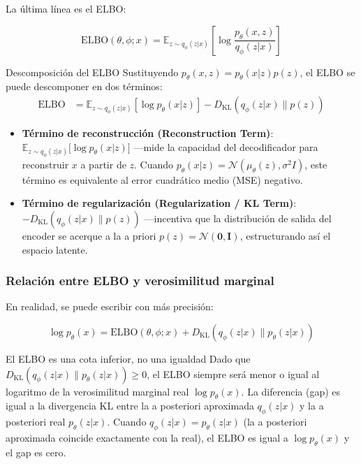La última línea es el ELBO:

$$\text{ELBO}(\theta, \phi; x) = \mathbb{E}_{z \sim q_\phi(z|x)} \left[\log \frac{p_\theta(x, z)}{q_\phi(z|x)}\right]$$

\begin{importantbox}{Descomposición del ELBO}
Sustituyendo $p_\theta(x, z) = p_\theta(x|z)p(z)$, el ELBO se puede descomponer en dos términos:
\begin{align}
\text{ELBO} &= \mathbb{E}_{z \sim q_\phi(z|x)} \left[\log p_\theta(x|z)\right] - D_{\mathrm{KL}}(q_\phi(z|x) \| p(z)) \nonumber
\end{align}
\begin{itemize}
    \item \textbf{Término de reconstrucción (Reconstruction Term)}: $\mathbb{E}_{z \sim q_\phi(z|x)} {[}\log p_\theta(x|z){]}$ —mide la capacidad del decodificador para reconstruir $x$ a partir de $z$. Cuando $p_\theta(x|z) = \mathcal{N}(\mu_\theta(z), \sigma^2 I)$, este término es equivalente al error cuadrático medio (MSE) negativo.
    \item \textbf{Término de regularización (Regularization / KL Term)}: $-D_{\mathrm{KL}}(q_\phi(z|x) \| p(z))$ —incentiva que la distribución de salida del encoder se acerque a la a priori $p(z) = \mathcal{N}(\mathbf{0}, \mathbf{I})$, estructurando así el espacio latente.
\end{itemize}
\end{importantbox}

\subsubsection{Relación entre ELBO y verosimilitud marginal}

En realidad, se puede escribir con más precisión:

$$\log p_\theta(x) = \text{ELBO}(\theta, \phi; x) + D_{\mathrm{KL}}(q_\phi(z|x) \| p_\theta(z|x))$$

\begin{warningbox}{El ELBO es una cota inferior, no una igualdad}
Dado que $D_{\mathrm{KL}}(q_\phi(z|x) \| p_\theta(z|x)) \geq 0$, el ELBO siempre será menor o igual al logaritmo de la verosimilitud marginal real $\log p_\theta(x)$. La diferencia (gap) es igual a la divergencia KL entre la a posteriori aproximada $q_\phi(z|x)$ y la a posteriori real $p_\theta(z|x)$. Cuando $q_\phi(z|x) = p_\theta(z|x)$ (la a posteriori aproximada coincide exactamente con la real), el ELBO es igual a $\log p_\theta(x)$ y el gap es cero.
\end{warningbox}

